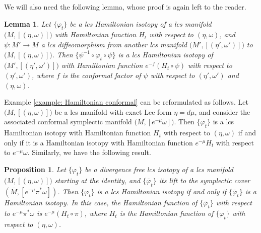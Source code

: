 \documentclass{amsart}
\newtheorem{prop}[thm]{Proposition}
\newtheorem{lemma}[thm]{Lemma}
\theoremstyle{remark}
\begin{document}
We will also need the following lemma,
whose proof is again left to the reader.

\begin{lemma}\label{lemma: Hamiltonian conjugation}
Let $\{\varphi_t\}$ be a lcs Hamiltonian isotopy
of a lcs manifold $\big(M, [(\eta, \omega)]\big)$
with Hamiltonian function $H_t$ with respect to $(\eta, \omega)$,
and $\psi: M' \rightarrow M$ a lcs diffeomorphism
from another lcs manifold $\big(M', [(\eta', \omega')]\big)$
to $\big(M, [(\eta, \omega)]\big)$.
Then $\{ \psi^{-1} \circ \varphi_t \circ \psi \}$
is a lcs Hamiltonian isotopy of $\big(M', [(\eta', \omega')]\big)$
with Hamiltonian function $e^{-f} (H_t \circ \psi)$
with respect to $(\eta', \omega')$,
where $f$ is the conformal factor of $\psi$
with respect to $(\eta', \omega')$ and $(\eta, \omega)$.
\end{lemma}

Example \ref{example: Hamiltonian conformal}
can be reformulated as follows.
Let $\big( M, [(\eta, \omega)] \big)$
be a lcs manifold with exact Lee form $\eta = d\mu$,
and consider the associated conformal symplectic manifold
$\big( M, [ e^{-\mu} \omega ] \big)$.
Then $\{\varphi_t\}$ is a lcs Hamiltonian isotopy
with Hamiltonian function $H_t$ with respect to $(\eta, \omega)$
if and only if it is a Hamiltonian isotopy
with Hamiltonian function $e^{-\mu}H_t$
with respect to $e^{-\mu}\omega$.
Similarly,
we have the following result.

\begin{prop}\label{proposition: lift of Hamiltonian isotopy to symplectic cover}
Let $\{\varphi_t\}$ be a divergence free lcs isotopy
of a lcs manifold $\big(M, [(\eta, \omega)]\big)$
starting at the identity,
and $\{ \bar{\varphi}_t \}$ its lift
to the symplectic cover $(\bar{M}, [e^{-\mu} \pi^{\ast}\omega])$.
Then $\{\varphi_t\}$ is a lcs Hamiltonian isotopy
if and only if $\{ \bar{\varphi}_t \}$ is a Hamiltonian isotopy.
In this case,
the Hamiltonian function of $\{ \bar{\varphi}_t \}$
with respect to $e^{-\mu} \pi^{\ast}\omega$
is $e^{-\mu} (H_t \circ \pi)$,
where $H_t$ is the Hamiltonian function of $\{\varphi_t\}$
with respect to $(\eta, \omega)$.
\end{prop}
\end{document}
